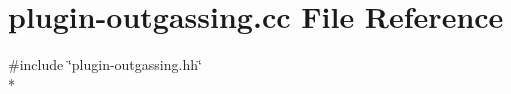 \hypertarget{plugin-outgassing_8cc}{}\section{plugin-\/outgassing.cc File Reference}
\label{plugin-outgassing_8cc}
{\ttfamily \#include \char`\"{}plugin-\/outgassing.\+hh\char`\"{}}\\*

